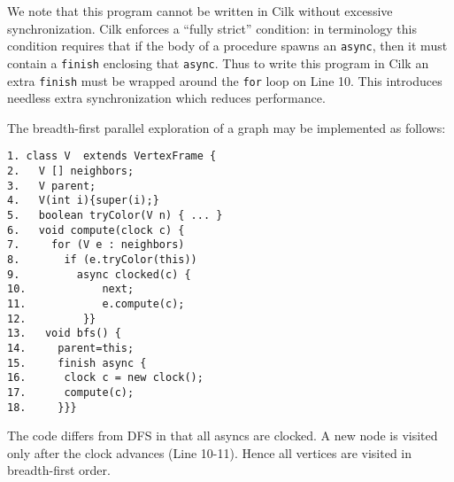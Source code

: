 We note that this program cannot be written in Cilk without excessive
synchronization. Cilk enforces a ``fully strict'' condition: in
\Xten{} terminology this condition requires that if the body of a
procedure spawns an {\tt async}, then it must contain a {\tt finish}
enclosing that {\tt async}.  Thus to write this program in Cilk an
extra {\tt finish} must be wrapped around the {\tt for} loop on Line
10. This introduces needless extra synchronization which reduces
performance.

\begin{example} \label{example:bfs}
The breadth-first parallel exploration of a graph may be implemented
as follows:
{\footnotesize
\begin{verbatim}
1. class V  extends VertexFrame {
2.   V [] neighbors;
3.   V parent;
4.   V(int i){super(i);}
5.   boolean tryColor(V n) { ... }
6.   void compute(clock c) {
7.     for (V e : neighbors) 
8.       if (e.tryColor(this)) 
9.         async clocked(c) { 
10.            next; 
11.            e.compute(c);
12.         }}
13.   void bfs() {
14.     parent=this;
15.     finish async {
16.      clock c = new clock();
17.      compute(c);
18.     }}}
\end{verbatim}}
The code differs from DFS in that all asyncs are clocked. 
A new node is visited only after the clock advances (Line 10-11).
Hence all vertices are visited in breadth-first order.
\end{example}
